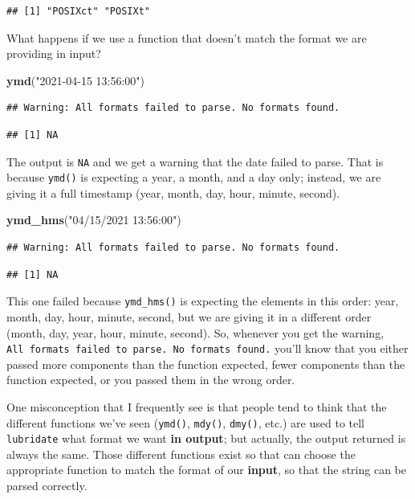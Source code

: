 \documentclass[
]{book}
\newenvironment{Shaded}{\begin{snugshade}}{\end{snugshade}}
\newcommand{\FunctionTok}[1]{\textcolor[rgb]{0.13,0.29,0.53}{\textbf{#1}}}
\newcommand{\NormalTok}[1]{#1}
\newcommand{\StringTok}[1]{\textcolor[rgb]{0.31,0.60,0.02}{#1}}
\begin{document}
\begin{verbatim}
## [1] "POSIXct" "POSIXt"
\end{verbatim}

What happens if we use a function that doesn't match the format we are providing in input?

\begin{Shaded}
\begin{Highlighting}[]
\FunctionTok{ymd}\NormalTok{(}\StringTok{"2021{-}04{-}15 13:56:00"}\NormalTok{)}
\end{Highlighting}
\end{Shaded}

\begin{verbatim}
## Warning: All formats failed to parse. No formats found.
\end{verbatim}

\begin{verbatim}
## [1] NA
\end{verbatim}

The output is \texttt{NA} and we get a warning that the date failed to parse. That is because \texttt{ymd()} is expecting a year, a month, and a day only; instead, we are giving it a full timestamp (year, month, day, hour, minute, second).

\begin{Shaded}
\begin{Highlighting}[]
\FunctionTok{ymd\_hms}\NormalTok{(}\StringTok{"04/15/2021 13:56:00"}\NormalTok{)}
\end{Highlighting}
\end{Shaded}

\begin{verbatim}
## Warning: All formats failed to parse. No formats found.
\end{verbatim}

\begin{verbatim}
## [1] NA
\end{verbatim}

This one failed because \texttt{ymd\_hms()} is expecting the elements in this order: year, month, day, hour, minute, second, but we are giving it in a different order (month, day, year, hour, minute, second). So, whenever you get the warning, \texttt{All\ formats\ failed\ to\ parse.\ No\ formats\ found.} you'll know that you either passed more components than the function expected, fewer components than the function expected, or you passed them in the wrong order.

One misconception that I frequently see is that people tend to think that the different functions we've seen (\texttt{ymd()}, \texttt{mdy()}, \texttt{dmy()}, etc.) are used to tell \texttt{lubridate} what format we want \textbf{in output}; but actually, the output returned is always the same. Those different functions exist so that can choose the appropriate function to match the format of our \textbf{input}, so that the string can be parsed correctly.
\end{document}
